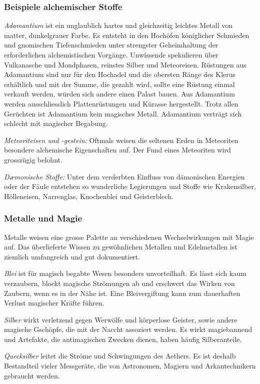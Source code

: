 \documentclass[10pt,twoside,twocolumn,openany]{book}
\begin{document}
\subsubsection{Beispiele alchemischer Stoffe}
\emph{Adamantium} ist ein unglaublich hartes und gleichzeitig leichtes Metall von matter, dunkelgrauer Farbe. Es entsteht in den Hochöfen königlicher Schmieden und gnomischen Tiefenschmieden unter strengster Geheimhaltung der erforderlichen alchemistischen Vorgänge.
Unwissende spekulieren über Vulkanasche und Mondphasen, reinstes Silber und Meteoreisen. Rüstungen aus Adamantium sind nur für den Hochadel und die obersten Ränge des Klerus erhältlich und mit der Summe, die gezahlt wird, sollte eine Rüstung einmal verkauft werden, würden sich andere einen Palast bauen. Aus Adamantium werden ausschliesslich Plattenrüstungen und Kürasse hergestellt.
Trotz allen Gerüchten ist Adamantium kein magisches Metall. Adamantium verträgt sich schlecht mit magischer Begabung.

\emph{Meteoriteisen und -gestein:} Oftmals weisen die seltenen Erden in Meteoriten besondere alchemische Eigenschaften auf. Der Fund eines Meteoriten wird grosszügig belohnt.

\emph{D\ae monische Stoffe:} Unter dem verderbten Einfluss von dämonischen Energien oder der Fäule entstehen so wunderliche Legierungen und Stoffe wie Krakensilber, Hölleneisen, Narrenglas, Knochenblei und Geisterblech.

\subsubsection{Metalle und Magie}
Metalle weisen eine grosse Palette an verschiedenen Wechselwirkungen mit Magie auf. Das überlieferte Wissen zu gewöhnlichen Metallen und Edelmetallen ist ziemlich umfangreich und gut dokumentiert.

\emph{Blei} ist für magisch begabte Wesen besonders unvorteilhaft. Es lässt sich kaum verzaubern, blockt magische Strömungen ab und erschwert das Wirken von Zaubern, wenn es in der Nähe ist. Eine Bleivergiftung kann zum dauerhaften Verlust magischer Kräfte führen. 

\emph{Silber} wirkt verletzend gegen Werwölfe und körperlose Geister, sowie andere magische Gschöpfe, die mit der Naccht assoziert werden. Es wirkt magiebannend und Artefakte, die antimagischen Zwecken dienen, haben häufig Silberanteile.

\emph{Quecksilber} leitet die Ströme und Schwingungen des Aethers. Es ist deshalb Bestandteil vieler Messgeräte, die von Astronomen, Magiern und Arkantechnikern gebraucht werden.
\end{document}
